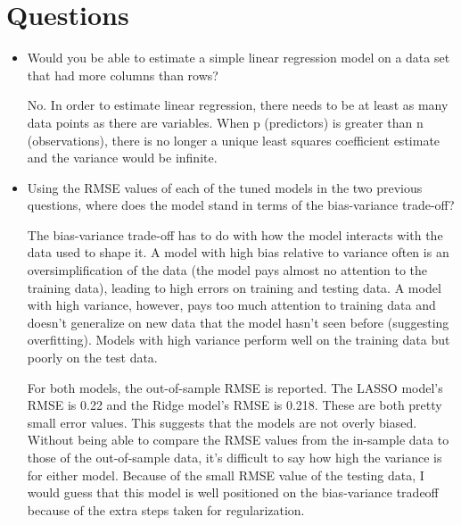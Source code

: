 \documentclass{article}
\begin{document}
\section{Questions}
\begin{itemize}
    \item Would you be able to estimate a simple linear regression model on a data set that had more columns than rows?
    
    No. In order to estimate linear regression, there needs to be at least as many data points as there are variables. When p (predictors) is greater than n (observations), there is no longer a unique least squares coefficient estimate and the variance would be infinite. 
    
    \item Using the RMSE values of each of the tuned models in the two previous questions, where does the model stand in terms of the bias-variance trade-off?
    
    The bias-variance trade-off has to do with how the model interacts with the data used to shape it. A model with high bias relative to variance often is an oversimplification of the data (the model pays almost no attention to the training data), leading to high errors on training and testing data. A model with high variance, however, pays too much attention to training data and doesn't generalize on new data that the model hasn't seen before (suggesting overfitting). Models with high variance perform well on the training data but poorly on the test data. 
    
    For both models, the out-of-sample RMSE is reported. The LASSO model's RMSE is 0.22 and the Ridge model's RMSE is 0.218. These are both pretty small error values. This suggests that the models are not overly biased. Without being able to compare the RMSE values from the in-sample data to those of the out-of-sample data, it's difficult to say how high the variance is for either model. Because of the small RMSE value of the testing data, I would guess that this model is well positioned on the bias-variance tradeoff because of the extra steps taken for regularization.
    
    
\end{itemize}
\end{document}
